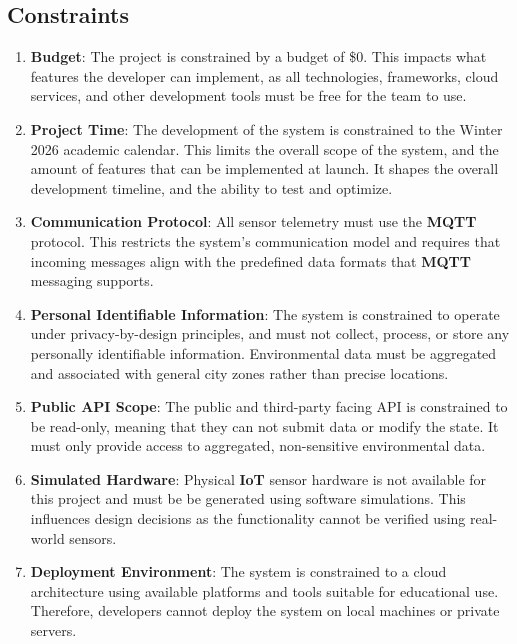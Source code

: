 \documentclass[]{article}
\begin{document}
\subsection{Constraints}
\label{sub:constraints}

\begin{enumerate}
    \item \textbf{Budget}: The project is constrained by a budget of \$0. This impacts what features the developer can implement, as all technologies, frameworks, cloud services, and other development tools must be free for the team to use.
    \item \textbf{Project Time}: The development of the system is constrained to the Winter 2026 academic calendar. This limits the overall scope of the system, and the amount of features that can be implemented at launch. It shapes the overall development timeline, and the ability to test and optimize. 
    \item \textbf{Communication Protocol}: All sensor telemetry must use the \textbf{MQTT} protocol. This restricts the system's communication model and requires that incoming messages align with the predefined data formats that \textbf{MQTT} messaging supports.
    \item \textbf{Personal Identifiable Information}: The system is constrained to operate under privacy-by-design principles, and must not collect, process, or store any personally identifiable information. Environmental data must be aggregated and associated with general city zones rather than precise locations.
    \item \textbf{Public API Scope}: The public and third-party facing API is constrained to be read-only, meaning that they can not submit data or modify the state. It must only provide access to aggregated, non-sensitive environmental data.
    \item \textbf{Simulated Hardware}: Physical \textbf{IoT} sensor hardware is not available for this project and must be be generated using software simulations. This influences design decisions as the functionality cannot be verified using real-world sensors.
    \item \textbf{Deployment Environment}: The system is constrained to a cloud architecture using available platforms and tools suitable for educational use. Therefore, developers cannot deploy the system on local machines or private servers.
\end{enumerate}
\end{document}
